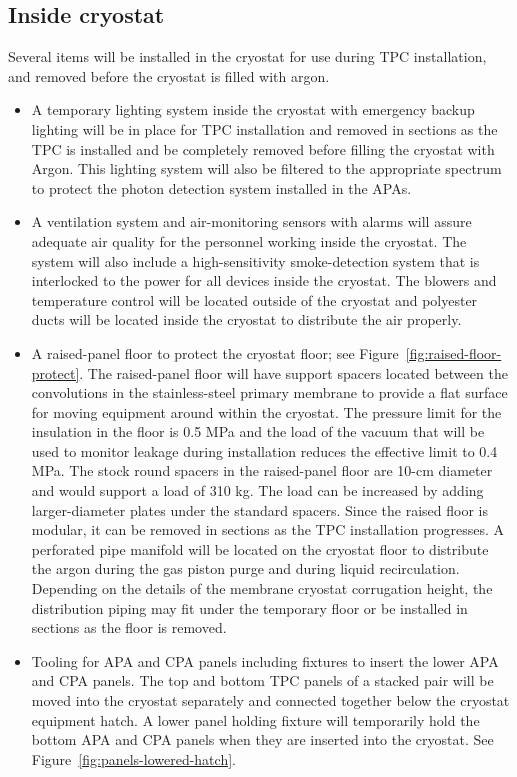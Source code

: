 \subsection{Inside cryostat}
\label{fd:install:tempeqp:inside}

Several items will be installed in the cryostat for use during TPC installation, and removed before the cryostat is filled with argon. 
\begin{itemize}
\item A temporary lighting system inside the cryostat with emergency backup lighting will be in place for TPC installation and removed in sections as the TPC is installed and be completely removed before filling the cryostat with Argon. This lighting system will also be filtered to the appropriate spectrum to protect the photon detection system installed in the APAs.  
\item A ventilation system and air-monitoring sensors with alarms will assure adequate air quality for the personnel working inside the cryostat. The system will also include a high-sensitivity smoke-detection system that is interlocked to the power for all devices inside the cryostat. The blowers and temperature control will be located outside of the cryostat and polyester ducts will be located inside the cryostat to distribute the air properly. 
\item A raised-panel floor to protect the cryostat floor; see Figure~\ref{fig:raised-floor-protect}. The raised-panel floor will have support spacers located between the convolutions in the stainless-steel primary membrane to provide a flat surface for moving equipment around within the cryostat. The pressure limit for the insulation in the floor is 0.5 MPa and the load of the vacuum that will be used to monitor leakage during installation reduces the effective limit to 0.4 MPa. The stock round spacers in the raised-panel floor are 10-cm diameter and would support a load of 310 kg. The load can be increased by adding larger-diameter plates under the standard spacers. Since the raised floor is modular, it can be removed in sections as the TPC installation progresses. A perforated pipe manifold will be located on the cryostat floor to distribute the argon during the gas piston purge and during liquid recirculation. Depending on the details of the membrane cryostat corrugation height, the distribution piping may fit under the temporary floor or be installed in sections as the floor is removed. 
\item Tooling for APA and CPA panels including fixtures to insert the lower APA and CPA panels. The top and bottom TPC panels of a stacked pair will be moved into the cryostat separately and connected together below the cryostat equipment hatch. A lower panel holding fixture will temporarily hold the bottom APA and CPA panels when they are inserted into the cryostat. See Figure~\ref{fig:panels-lowered-hatch}. 

\end{itemize}
